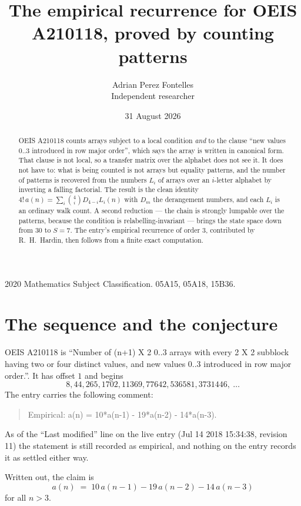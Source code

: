 \documentclass[11pt,a4paper]{article}
\title{The empirical recurrence for OEIS A210118, proved by counting patterns}
\author{Adrian Perez Fontelles\\ \small Independent researcher}
\date{31 August 2026}
\theoremstyle{plain}
\theoremstyle{definition}
\begin{document}
\maketitle

\begin{abstract}
OEIS A210118 counts arrays subject to a local condition \emph{and} to the clause ``new values
$0..3$ introduced in row major order'', which says the array is written in canonical
form. That clause is not local, so a transfer matrix over the alphabet does not see it. It
does not have to: what is being counted is not arrays but equality patterns, and the number
of patterns is recovered from the numbers $L_i$ of arrays over an $i$-letter alphabet by
inverting a falling factorial. The result is the clean identity
$4!\,a(n)=\sum_i\binom{4}{i}D_{4-i}L_i(n)$ with $D_m$ the derangement numbers,
and each $L_i$ is an ordinary walk count. A second reduction --- the chain is strongly
lumpable over the patterns, because the condition is relabelling-invariant --- brings the
state space down from $30$ to $S=7$. The entry's empirical recurrence of order
$3$, contributed by R.~H.~Hardin, then follows from a finite exact computation.
\end{abstract}

\noindent\small 2020 Mathematics Subject Classification. 05A15, 05A18, 15B36.\normalsize

\section{The sequence and the conjecture}

OEIS A210118 is ``Number of (n+1) X 2 0..3 arrays with every 2 X 2 subblock having two or four distinct values, and new values 0..3 introduced in row major order.''. It has offset $1$ and begins
\[
8, 44, 265, 1702, 11369, 77642, 536581, 3731446,\ \dots
\]
The entry carries the following comment:
\begin{quote}\small
Empirical: a(n) = 10*a(n-1) - 19*a(n-2) - 14*a(n-3).
\end{quote}
As of the ``Last modified'' line on the live entry (Jul 14 2018 15:34:38, revision 11) the statement is
still recorded as empirical, and nothing on the entry records it as settled either way.

Written out, the claim is
\begin{equation}\label{eq:conj}
a(n)\;=\;10\,a(n-1) - 19\,a(n-2) - 14\,a(n-3)
\end{equation}
for all $n>3$.
\end{document}
